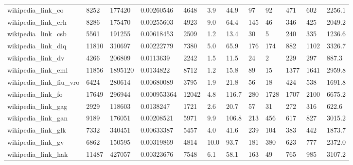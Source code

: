\begin{longtable}{llllllllllll}
 wikipedia\_link\_co                                  & 8252       & 177420    & 0.00260546  & 4648  & 3.9    & 44.9   & 97    & 92     & 471    & 602    & 2256.1  \\
 wikipedia\_link\_crh                                 & 8286       & 175470    & 0.00255603  & 4923  & 9.0    & 64.4   & 145   & 46     & 346    & 425    & 2049.2  \\
 wikipedia\_link\_csb                                 & 5561       & 191255    & 0.00618453  & 2509  & 1.2    & 13.4   & 30    & 5      & 240    & 335    & 1236.6  \\
 wikipedia\_link\_diq                                 & 11810      & 310697    & 0.00222779  & 7380  & 5.0    & 65.9   & 176   & 174    & 882    & 1102   & 3326.7  \\
 wikipedia\_link\_dv                                  & 4266       & 206809    & 0.0113639   & 2242  & 1.5    & 11.5   & 24    & 2      & 229    & 297    & 887.3   \\
 wikipedia\_link\_eml                                 & 11856      & 1895120   & 0.0134822   & 8712  & 1.2    & 15.8   & 89    & 15     & 1377   & 1641   & 2959.8  \\
 wikipedia\_link\_fiu\_vro                             & 6424       & 280614    & 0.00680089  & 3795  & 1.9    & 21.8   & 56    & 18     & 424    & 538    & 1691.8  \\
 wikipedia\_link\_fo                                  & 17649      & 296944    & 0.000953364 & 12042 & 4.8    & 116.7  & 280   & 1728   & 1707   & 2100   & 6675.2  \\
 wikipedia\_link\_gag                                 & 2929       & 118603    & 0.0138247   & 1721  & 2.6    & 20.7   & 57    & 31     & 272    & 316    & 622.6   \\
 wikipedia\_link\_gan                                 & 9189       & 176051    & 0.00208521  & 5971  & 9.9    & 106.8  & 213   & 456    & 617    & 827    & 3015.2  \\
 wikipedia\_link\_glk                                 & 7332       & 340451    & 0.00633387  & 5457  & 4.0    & 41.6   & 239   & 104    & 383    & 442    & 1873.7  \\
 wikipedia\_link\_gv                                  & 6862       & 150595    & 0.00319869  & 4814  & 10.0   & 93.7   & 181   & 380    & 623    & 777    & 2372.0  \\
 wikipedia\_link\_hak                                 & 11487      & 427057    & 0.00323676  & 7548  & 6.1    & 58.1   & 163   & 49     & 765    & 985    & 3107.2  \\

\end{longtable}
